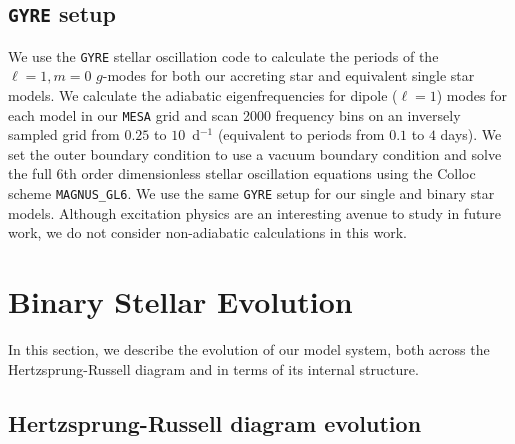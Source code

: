 \documentclass[desactivate]{aa}
\begin{document}
\subsection{\texttt{GYRE} setup} \label{sec: gyre_setup}

We use the \texttt{GYRE} stellar oscillation code \citep[version 7.1, ][]{Townsend+2013,Townsend+2018,Goldstein+2020,Sun+2023} to calculate the periods of the ${\ell = 1}, {m = 0}$ $g$-modes for both our accreting star and equivalent single star models. We calculate the adiabatic eigenfrequencies for dipole ($\ell=1$) modes for each model in our \texttt{MESA} grid and scan 2000 frequency bins on an inversely sampled grid from $0.25$ to $10$~d$^{-1}$ (equivalent to periods from $0.1$ to $4$ days). We set the outer boundary condition to use a vacuum boundary condition and solve the full 6th order dimensionless stellar oscillation equations \citep{Dziembowski+1971, Christensen-Dalsgaard+2008} using the Colloc scheme \texttt{MAGNUS\_GL6}. We use the same \texttt{GYRE} setup for our single and binary star models. Although excitation physics are an interesting avenue to study in future work, we do not consider non-adiabatic calculations in this work.

\section{Binary Stellar Evolution}\label{sec:bse}

In this section, we describe the evolution of our model system, both across the Hertzsprung-Russell diagram and in terms of its internal structure.

\subsection{Hertzsprung-Russell diagram evolution}\label{sec:hrd}
\end{document}
